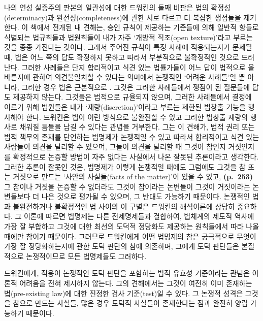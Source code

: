 나의 연성 실증주의 판본의 일관성에 대한 드워킨의 둘째 비판은 법의
확정성(determinacy)과 완전성(completeness)에 관한 서로 다르고 더 복잡한
쟁점들을 제기한다. 이 책에서 전개된 내 견해는, 승인 규칙이 제공하는
기준들에 의해 일반적 항들로 식별되는 법규칙들과 법원칙들이 내가 자주
‘개방적 직조(open texture)’라고 부르는 것을 종종 가진다는 것이다. 그래서
주어진 규칙이 특정 사례에 적용되는지가 문제될 때, 법은 어느 쪽의 답도
확정하지 못하고 따라서 부분적으로 불확정적인 것으로 드러난다. 그러한
사례들은 단지 합리적이고 식견 있는 법률가들이 어느 답이 법적으로
올바른지에 관하여 의견불일치할 수 있다는 의미에서 논쟁적인 ‘어려운
사례들’일 뿐 아니라, 그러한 경우 법은 근본적으로 .
그것은 그러한 사례들에서 쟁점이 된 질문들에  답도 제공하지
않는다. 그것들은 법적으로 규율되지 않으며, 그러한 사례들에서 결정에
이르기 위해 법원들은 내가 ‘재량(discretion)’이라고 부르는 제한된 법창출
기능을 행사해야 한다. 드워킨은 법이 이런 방식으로 불완전할 수 있고
그러한 법창출 재량의 행사로 채워질 틈들을 남길 수 있다는 관념을
거부한다. 그는 이 견해가, 법적 권리 또는 법적 책무의 존재를 단언하는
법명제가 논쟁적일 수 있고 따라서 합리적이고 식견 있는 사람들이 의견을
달리할 수 있으며, 그들이 의견을 달리할 때 그것이 참인지 거짓인지를
확정적으로 논증할 방법이 자주 없다는 사실에서 나온 잘못된 추론이라고
생각한다. 그러한 추론이 잘못인 것은, 법명제가 이렇게 논쟁적일 때에도
그럼에도 그것을 참 또는 거짓으로 만드는 ‘사안의 사실들(facts of the
matter)’이 있을 수 있고, \textbf{(p.~253)} 그 참이나 거짓을 논증할 수
없더라도 그것이 참이라는 논변들이 그것이 거짓이라는 논변들보다 더 나은
것으로 평가될 수 있으며, 그 반대도 가능하기 때문이다. 논쟁적인 법과
불완전하거나 불확정적인 법 사이의 이 구별은 드워킨의 해석이론에 상당히
중요하다. 그 이론에 따르면 법명제는 다른 전제명제들과 결합하여, 법체계의
제도적 역사에 가장 잘 부합하고 그것에 대한 최선의 도덕적 정당화도
제공하는 원칙들에서 따라 나올 때에만 참이기 때문이다. 그러므로
드워킨에게 어떤 법명제의 참은 궁극적으로 무엇이 가장 잘 정당화하는지에
관한 도덕 판단의 참에 의존하며, 그에게 도덕 판단들은 본질적으로
논쟁적이므로 모든 법명제들도 그러하다.

드워킨에게, 적용이 논쟁적인 도덕 판단을 포함하는 법적 유효성 기준이라는
관념은 이론적 어려움을 전혀 제시하지 않는다. 그의 견해에서는 그것이
여전히 이미 존재하는 법(pre-existing law)에 대한 진정한 검사
기준(test)일 수 있다. 그 논쟁적 성격은 그것을 참으로 만드는 사실들, 많은
경우 도덕적 사실들이 존재한다는 점과 완전히 양립 가능하기 때문이다.


